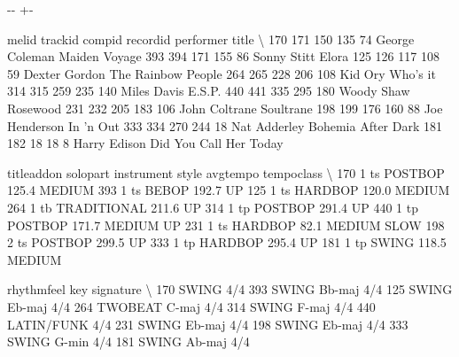 \documentclass[letterpaper,10pt,english]{sphinxmanual}
\newlength\nbsphinxcodecellspacing
\begin{document}
{

\kern-\sphinxverbatimsmallskipamount\kern-\baselineskip
\kern+\FrameHeightAdjust\kern-\fboxrule
\vspace{\nbsphinxcodecellspacing}

\begin{sphinxVerbatim}[commandchars=\\\{\}]
\llap{\color{nbsphinxout}[8]:\,\hspace{\fboxrule}\hspace{\fboxsep}}     melid  trackid  compid  recordid       performer                   title  \textbackslash{}
170    171      150     135        74  George Coleman           Maiden Voyage
393    394      171     155        86     Sonny Stitt                   Elora
125    126      117     108        59   Dexter Gordon      The Rainbow People
264    265      228     206       108         Kid Ory                Who's it
314    315      259     235       140     Miles Davis                  E.S.P.
440    441      335     295       180      Woody Shaw                Rosewood
231    232      205     183       106   John Coltrane               Soultrane
198    199      176     160        88   Joe Henderson               In 'n Out
333    334      270     244        18    Nat Adderley      Bohemia After Dark
181    182       18      18         8    Harry Edison  Did You Call Her Today

    titleaddon  solopart instrument        style  avgtempo   tempoclass  \textbackslash{}
170                    1         ts      POSTBOP     125.4       MEDIUM
393                    1         ts        BEBOP     192.7           UP
125                    1         ts      HARDBOP     120.0       MEDIUM
264                    1         tb  TRADITIONAL     211.6           UP
314                    1         tp      POSTBOP     291.4           UP
440                    1         tp      POSTBOP     171.7    MEDIUM UP
231                    1         ts      HARDBOP      82.1  MEDIUM SLOW
198                    2         ts      POSTBOP     299.5           UP
333                    1         tp      HARDBOP     295.4           UP
181                    1         tp        SWING     118.5       MEDIUM

     rhythmfeel     key signature  \textbackslash{}
170       SWING               4/4
393       SWING  Bb-maj       4/4
125       SWING  Eb-maj       4/4
264     TWOBEAT   C-maj       4/4
314       SWING   F-maj       4/4
440  LATIN/FUNK               4/4
231       SWING  Eb-maj       4/4
198       SWING  Eb-maj       4/4
333       SWING   G-min       4/4
181       SWING  Ab-maj       4/4


\end{sphinxVerbatim}}
\end{document}
